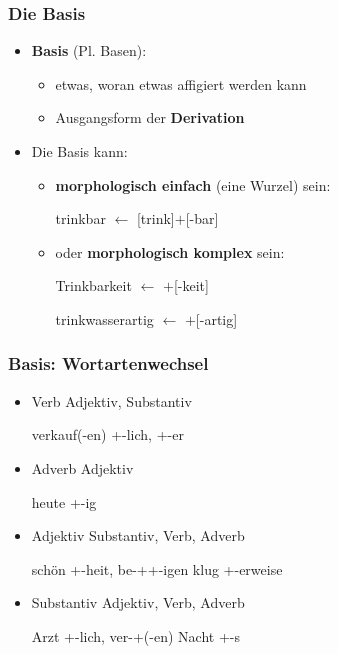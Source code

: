 \begin{frame}
\frametitle{Die Basis}

\begin{itemize}
	\item \textbf{Basis} (Pl. Basen):
	
	\begin{itemize}
		\item etwas, woran etwas affigiert werden kann
		\item Ausgangsform der \textbf{Derivation}
	\end{itemize}
	
	\item Die Basis kann:
	
	\begin{itemize}
		\item \textbf{morphologisch einfach} (eine Wurzel) sein:
		
		\ea trinkbar $\leftarrow$  [trink]$+$[-bar]
		\z
		
		\item oder \textbf{morphologisch komplex} sein:

		\settowidth{} 		
		
		
		\ea Trinkbarkeit $\leftarrow$  \alertred{[[trink]$+$[-bar]]}$+$[-keit] 

		\ex trinkwasserartig $\leftarrow$  \alertred{[[trink]$+$[wasser]]}$+$[-artig]  
		\z
		
	\end{itemize}
	
\end{itemize}


\end{frame}



\begin{frame}
\frametitle{Basis: Wortartenwechsel}

	\begin{itemize}
		\item Verb \ras Adjektiv, Substantiv
		
		\ea verkauf(-en) \ras {}+-lich, +-er
		\z
		
		\item Adverb \ras Adjektiv
		
		\ea heute \ras {}+-ig
		\z
		
		\item Adjektiv \ras Substantiv, Verb, Adverb
		
		\eal 
			\ex schön \ras {}+-heit, be-++-igen
			\ex klug \ras {}+-erweise
		\zl
		
		\item Substantiv \ras Adjektiv, Verb, Adverb

		\eal 
			\ex Arzt \ras {}+-lich, ver-+(-en)
			\ex Nacht \ras {}+-s
		\zl
		
	\end{itemize}
	
\end{frame}


